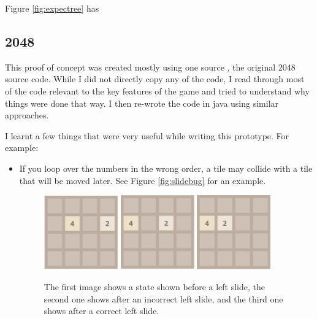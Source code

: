 \documentclass{article}
\begin{document}
Figure \ref{fig:expectree} has 

\subsection{2048}
\label{subsec:2048}
This proof of concept was created mostly using one source \cite{source2048}, the original 2048 source code. While I did not
directly copy any of the code, I read through most of the code relevant to the key features of the game and tried to understand 
why things were done that way. I then re-wrote the code in java using similar approaches.

I learnt a few things that were very useful while writing this prototype. For example: 
\begin{itemize}
    \item If you loop over the numbers in the wrong order, a tile may collide with a tile that will be moved later. 
    See Figure \ref{fig:slidebug} for an example.
    \begin{figure}
        \centering
        \includegraphics[width=0.3\textwidth]{2048_slide.png}
        \includegraphics[width=0.3\textwidth]{2048_slide2.png}
        \includegraphics[width=0.3\textwidth]{2048_slide3.png}
        \caption{The first image shows a state shown before a left slide, the second one shows after an incorrect left slide, and the third one shows after a correct left slide.}

\end{figure}
\end{itemize}
\end{document}
